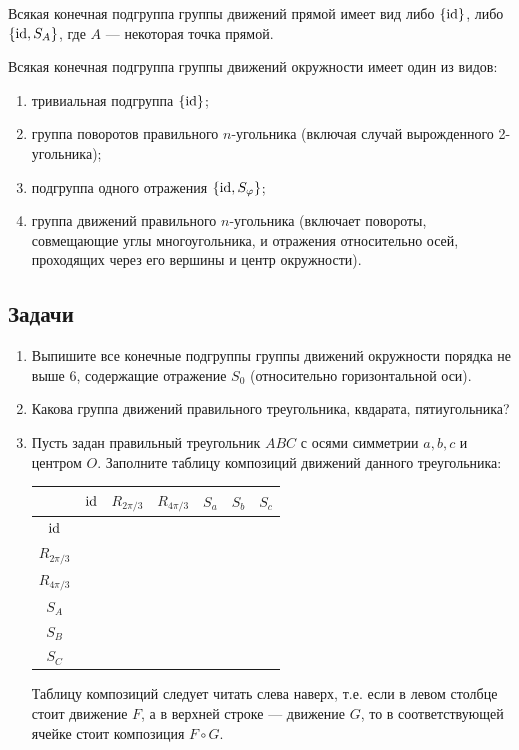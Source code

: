Всякая конечная подгруппа группы движений прямой имеет вид либо $\{\mathrm{id}\}$, либо $\{\mathrm{id},S_A\}$, где $A$ --- некоторая точка прямой.

Всякая конечная подгруппа группы движений окружности имеет один из видов:
\begin{enumerate}
\item тривиальная подгруппа $\{\mathrm{id}\}$;
\item группа поворотов правильного $n$-угольника (включая случай вырожденного 2-угольника);
\item подгруппа одного отражения $\{\mathrm{id},S_\varphi\}$;
\item группа движений правильного $n$-угольника (включает повороты, совмещающие углы многоугольника, и отражения относительно осей, проходящих через его вершины и центр окружности).
\end{enumerate}


\subsection*{Задачи}

\begin{enumerate}
\item Выпишите все конечные подгруппы группы движений окружности порядка не выше 6, содержащие отражение $S_0$ (относительно горизонтальной оси).
\item Какова группа движений правильного треугольника, квдарата, пятиугольника?
\item Пусть задан правильный треугольник $ABC$ с осями симметрии $a,b,c$ и центром $O$. Заполните таблицу композиций движений данного треугольника:
\begin{table}[htb!]\begin{center}
\begin{tabular}{c||c|c|c||c|c|c|}
             & $\mathrm{id}$        & $R_{2\pi/3}$ & $R_{4\pi/3}$ & $S_a$        & $S_b$        & $S_c$  \\
\hline\hline
$\mathrm{id}$        & \phantom{$R_{2\pi/3}$} & \phantom{$R_{2\pi/3}$} & \phantom{$R_{2\pi/3}$} & \phantom{$R_{2\pi/3}$} & \phantom{$R_{2\pi/3}$} & \phantom{$R_{2\pi/3}$} \\  \hline
$R_{2\pi/3}$ &  &  &  &  &  &  \\  \hline
$R_{4\pi/3}$ &  &  &  &  &  &  \\  \hline
$S_A$        &  &  &  &  &  &  \\  \hline
$S_B$        &  &  &  &  &  &  \\  \hline
$S_C$        &  &  &  &  &  &  \\  \hline
\end{tabular}
\end{center}\end{table}
Таблицу композиций следует читать слева наверх, т.е. если в левом столбце стоит движение $F$, а в верхней строке --- движение $G$, то в соответствующей ячейке стоит композиция $F\circ G$.
\end{enumerate}



